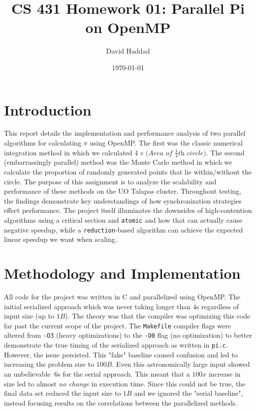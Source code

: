 \documentclass[twocolumn]{article}
\title{CS 431 Homework 01: Parallel Pi on OpenMP}
\author{David Haddad}
\date{\today}
\begin{document}
\maketitle

\section{Introduction}
This report details the implementation and performance analysis of two parallel algorithms for calculating $\pi$ using OpenMP. The first was the classic numerical integration method in which we calculated $4 \times (\textit{Area of $\frac{1}{4}$th circle)}$. The second (embarrassingly parallel) method was the Monte Carlo method in which we calculate the proportion of randomly generated points that lie within/without the circle.  The purpose of this assignment is to analyze the scalability and performance of these methods on the UO Talapas cluster. Throughout testing, the findings demonstrate key understandings of how synchronization strategies effect performance. The project itself illuminates the downsides of high-contention algorithms using a critical section and \texttt{atomic} and how that can actually cause negative speedup, while a \texttt{reduction}-based algorithm can achieve the expected linear speedup we want when scaling.  

\section{Methodology and Implementation}

All code for the project was written in C and parallelized using OpenMP. The initial serialized approach which was never taking longer than $4$s regardless of input size (up to $1B$). The theory was that the compiler was optimizing this code far past the current scope of the project. The \texttt{Makefile} compiler flags were altered from \texttt{-O3} (heavy optimizations) to the \texttt{-O0} flag (no optimization) to better demonstrate the true timing of the serialized approach as written in \texttt{pi.c}. However, the issue persisted. This "fake" baseline caused confusion and led to increasing the problem size to $100B$. Even this astronomically large input showed an unbelievable $~6$s for the serial approach. This meant that a $100x$ increase in size led to almost \textit{no change} in execution time. Since this could not be true, the final data set reduced the input size to $1B$ and we ignored the "serial baseline", instead focusing results on the correlations between the parallelized methods.
\end{document}

